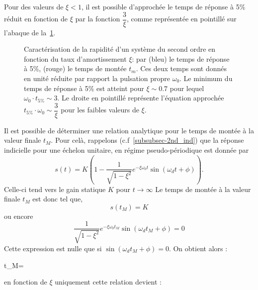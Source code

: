 Pour des valeurs de $\xi<1$, il est possible d'approchée le temps de 
réponse à 5\% réduit en fonction de $\xi$ par la fonction $\dfrac{3}{\xi}$,
comme représentée en pointillé sur l'abaque de 
la~\cref{fig-2nd_temps_reponse_1}.



\begin{figure}[!h]
    \centering
    
    \caption{Caractérisation de la rapidité d'un système du second ordre en
             fonction du taux d'amortissement $\xi$: par
             (bleu) le temps de réponse à 5\%,  
             (rouge) le temps de montée $t_m$.
             Ces deux temps sont donnés en unité réduite
             par rapport la pulsation propre $\omega_0$.
             Le minimum du temps de réponse à 5\% est atteint pour $\xi\sim0.7$ 
             pour lequel $\omega_0\cdot t_{5\%}\sim3$.
             Le droite en pointillé représente l'équation approchée 
             $t_{5\%}\cdot\omega_0\sim\dfrac{3}{\xi}$ pour les faibles valeurs 
             de $\xi$.
             \label{fig-2nd_temps_reponse_1}}
\end{figure}
\clearpage
Il est possible de déterminer une relation analytique pour le temps
de montée à la valeur finale $t_{M}$. Pour celà, rappelons 
(c.f~\cref{subsubsec-2nd_ind}) 
que la réponse indicielle pour une échelon unitaire, en régime 
pseudo-périodique est donnée par 
\[
s(t) = K \left( 1 - 
       \dfrac{1}{\sqrt{1-\xi^2}} 
       e^{-\xi\omega_0 t}
       \sin{(\omega_d t+\phi)}\right).\label{eq-2-3_2nd} 
\]
Celle-ci tend vers le gain statique $K$ pour $t\to\infty$
Le temps de montée à la valeur finale $t_{M}$ est donc tel que, 
\[
s(t_{M})=K
\]
ou encore  
\[
\dfrac{1}{\sqrt{1-\xi^2}}e^{-\xi\omega_0 t_{M}}\sin{(\omega_d t_{M}+\phi)}=0
\]
Cette expression est nulle que si $\sin{(\omega_d t_{M}+\phi)}=0$.
On obtient alors :
\begin{bequation}
t_{M}=\label{eq-tM}
\end{bequation}
en fonction de $\xi$ uniquement cette relation devient :
